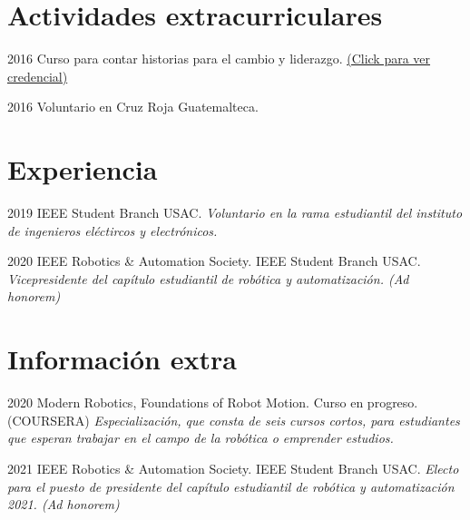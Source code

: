 \documentclass[]{twentysecondcv}
\begin{document}

\section{Actividades extracurriculares}

\begin{twentyshort}

	\twentyitemshort
    	{2016}
    	{Curso para contar historias para el cambio y liderazgo. \href{https://www.coursera.org/account/accomplishments/verify/HG4MHZYP8JXW}{(Click para ver credencial)}}
    
	\twentyitemshort
    	{2016}
    	{Voluntario en Cruz Roja Guatemalteca.}   
    	
\end{twentyshort}



\section{Experiencia}

\begin{twenty}

	\twentyitem
    	{2019}
    	{ }
    	{IEEE Student Branch USAC.}
    	{\emph{Voluntario en la rama estudiantil del instituto de ingenieros el\'ectircos y electr\'onicos.}}
    	
    	
	\twentyitem
    	{2020}
    	{IEEE Robotics \& Automation Society.}
    	{IEEE Student Branch USAC.}
    	{\emph{Vicepresidente del cap\'itulo estudiantil de rob\'otica y automatizaci\'on. (Ad honorem)}}
    
\end{twenty}

\section{Informaci\'on extra}

\begin{twenty}

	\twentyitem
    	{2020}
    	{Modern Robotics, Foundations of Robot Motion.}
    	{Curso en progreso. (COURSERA)}
    	{\emph{Especializaci\'on, que consta de seis cursos cortos, para estudiantes que esperan trabajar en el campo de la rob\'otica o emprender estudios.}}

	\twentyitem
    	{2021}
    	{IEEE Robotics \& Automation Society.}
    	{IEEE Student Branch USAC.}
    	{\emph{Electo para el puesto de presidente del cap\'itulo estudiantil de rob\'otica y automatizaci\'on 2021. (Ad honorem)}}
    	
    
\end{twenty}
\end{document}
